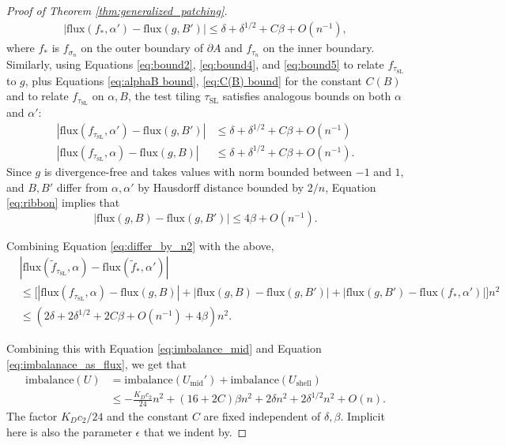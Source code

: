 \documentclass[11pt]{article}
\theoremstyle{remark}
\theoremstyle{definition}
\begin{document}
\begin{proof}[Proof of Theorem \ref{thm:generalized_patching}]
 \begin{align}
    |\text{flux}(f_{*},\alpha') - \text{flux}(g,B')| \leq \delta + \delta^{1/2} + C\beta + O(n^{-1}),
\end{align}
where $f_{*}$ is $f_{\sigma_n}$ on the outer boundary of $\partial A$ and $f_{\tau_n}$ on the inner boundary. Similarly, using Equations \eqref{eq:bound2}, \eqref{eq:bound4}, and \eqref{eq:bound5} to relate $f_{\tau_\text{SL}}$ to $g$, plus Equations \eqref{eq:alphaB bound}, \eqref{eq:C(B) bound} for the constant $C(B)$ and to relate $f_{\tau_\text{SL}}$ on $\alpha, B$, the test tiling $\tau_{\text{SL}}$ satisfies analogous bounds on both $\alpha$ and $\alpha'$:
\begin{align}
    |\text{flux}(f_{\tau_{\text{SL}}},\alpha') - \text{flux}(g,B')| &\leq \delta +\delta^{1/2}+ C\beta + O(n^{-1})\\
     |\text{flux}(f_{\tau_{\text{SL}}},\alpha) - \text{flux}(g,B)| &\leq \delta +\delta^{1/2} + C\beta + O(n^{-1}).
\end{align}
Since $g$ is divergence-free and takes values with norm bounded between $-1$ and $1$, and $B,B'$ differ from $\alpha,\alpha'$ by Hausdorff distance bounded by $2/n$, Equation \eqref{eq:ribbon} implies that
    \begin{equation}\label{eq:bound6}
        |\text{flux}(g,B) - \text{flux}(g,B')| \leq 4\beta + O(n^{-1}).
    \end{equation}

Combining Equation \eqref{eq:differ_by_n2} with the above, 
    \begin{align}
        &|\text{flux}(\widetilde f_{\tau_{\text{SL}}},\alpha) - \text{flux}(\widetilde f_{\ast},\alpha')| \\
        &\leq \bigg[|\text{flux}(f_{\tau_{\text{SL}}},\alpha)-\text{flux}(g,B)| +|\text{flux}(g,B)-\text{flux}(g,B')| +|\text{flux}(g,B')-\text{flux}(f_{*},\alpha')|\bigg] n^2 \\
        &\leq (2 \delta + 2\delta^{1/2} + 2 C \beta + O(n^{-1}) + 4\beta )n^2.
    \end{align}

    Combining this with Equation \eqref{eq:imbalance_mid} and Equation \eqref{eq:imbalanace_as_flux}, we get that
    \begin{align*}
        \text{imbalance}(U) &= \text{imbalance}(U_{\text{mid}}') + \text{imbalance}(U_{\text{shell}}) \\
        &\leq -\frac{K_D c_2}{24}n^2 + (16+2C)\beta n^2 + 2\delta n^2 + 2\delta^{1/2} n^2 + O(n).
    \end{align*}
    The factor $K_D c_2/24$ and the constant $C$ are fixed independent of $\delta,\beta$. Implicit here is also the parameter $\epsilon$ that we indent by.
    

\end{proof}
\end{document}
